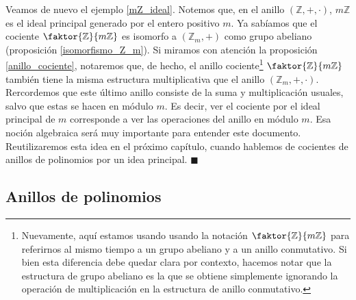 \begin{example} 
Veamos de nuevo el ejemplo \ref{mZ_ideal}. Notemos que, en el anillo $(\mathbb{Z}, +, \cdot)$, $m\mathbb{Z}$ es el ideal principal generado por el entero positivo $m$. Ya sabíamos que el cociente $\faktor{\mathbb{Z}}{m\mathbb{Z}}$ es isomorfo a $(\mathbb{Z}_m, +)$ como grupo abeliano (proposición \ref{isomorfismo_Z_m}). Si miramos con atención la proposición \ref{anillo_cociente}, notaremos que, de hecho, el anillo cociente\footnote{Nuevamente, aquí estamos usando usando la notación $\faktor{\mathbb{Z}}{m\mathbb{Z}}$ para referirnos al mismo tiempo a un grupo abeliano y a un anillo conmutativo. Si bien esta diferencia debe quedar clara por contexto, hacemos notar que la estructura de grupo abeliano es la que se obtiene simplemente ignorando la operación de multiplicación en la estructura de anillo conmutativo.} $\faktor{\mathbb{Z}}{m\mathbb{Z}}$ también tiene la misma estructura multiplicativa que el anillo $(\mathbb{Z}_m, +, \cdot)$. Rercordemos que este último anillo consiste de la suma y multiplicación usuales, salvo que estas se hacen en módulo $m$. Es decir, ver el cociente por el ideal principal de $m$ corresponde a ver las operaciones del anillo en módulo $m$. Esa noción algebraica será muy importante para entender este documento. Reutilizaremos esta idea en el próximo capítulo, cuando hablemos de cocientes de anillos de polinomios por un idea principal. \hfill$\blacksquare$
\end{example}

\subsection{Anillos de polinomios}
